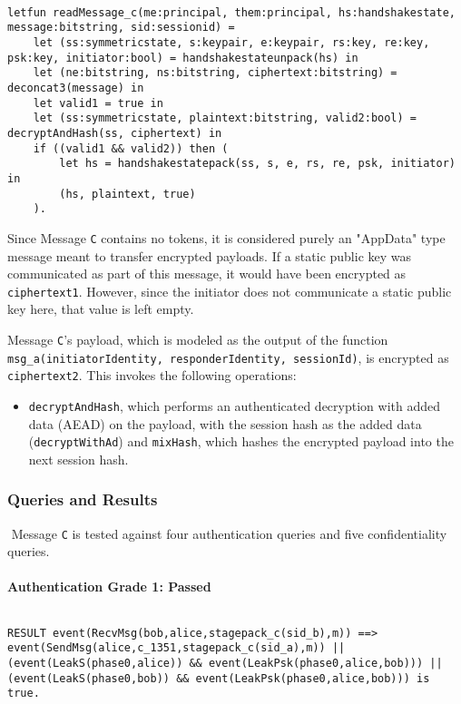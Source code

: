 \begin{lstlisting}

letfun readMessage_c(me:principal, them:principal, hs:handshakestate, message:bitstring, sid:sessionid) =
	let (ss:symmetricstate, s:keypair, e:keypair, rs:key, re:key, psk:key, initiator:bool) = handshakestateunpack(hs) in
	let (ne:bitstring, ns:bitstring, ciphertext:bitstring) = deconcat3(message) in
	let valid1 = true in
	let (ss:symmetricstate, plaintext:bitstring, valid2:bool) = decryptAndHash(ss, ciphertext) in
	if ((valid1 && valid2)) then (
		let hs = handshakestatepack(ss, s, e, rs, re, psk, initiator) in
		(hs, plaintext, true)
	).

\end{lstlisting}

Since Message \texttt{C} contains no tokens, it is considered purely an "AppData" type message meant to transfer encrypted payloads.
If a static public key was communicated as part of this message, it would have been encrypted as \texttt{ciphertext1}. However, since the initiator does not communicate a static public key here, that value is left empty.


Message \texttt{C}'s payload, which is modeled as the output of the function \texttt{msg\_a(initiatorIdentity, responderIdentity, sessionId)}, is encrypted as \texttt{ciphertext2}. This invokes the following operations:


\begin{itemize}

\item \texttt{decryptAndHash}, which performs an authenticated decryption with added data (AEAD) on the payload, with the session hash as the added data (\texttt{decryptWithAd}) and \texttt{mixHash}, which hashes the encrypted payload into the next session hash.

\end{itemize}
\subsubsection{Queries and Results}$ $
Message \texttt{C} is tested against four authentication queries and five confidentiality queries.
\paragraph{Authentication Grade 1: Passed}$ $
\begin{lstlisting}
RESULT event(RecvMsg(bob,alice,stagepack_c(sid_b),m)) ==> event(SendMsg(alice,c_1351,stagepack_c(sid_a),m)) || (event(LeakS(phase0,alice)) && event(LeakPsk(phase0,alice,bob))) || (event(LeakS(phase0,bob)) && event(LeakPsk(phase0,alice,bob))) is true.
\end{lstlisting}

